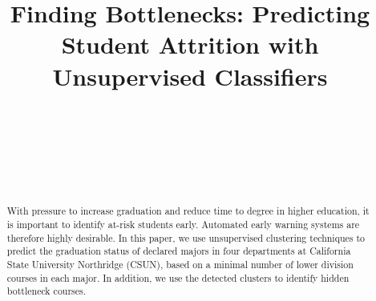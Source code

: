 \documentclass{sigchi}
\begin{document}
\title{Finding Bottlenecks: Predicting Student Attrition with Unsupervised Classifiers}

\author{%
  \\
 \\
  \\
  \\
  \\
}

\maketitle
\begin{abstract}
  
With pressure to increase graduation and reduce time to degree in higher education, it is important to identify at-risk students early. Automated early warning systems are therefore highly desirable. In this paper, we use unsupervised clustering techniques to predict the graduation status of declared majors in four departments at California State University Northridge (CSUN), based on a minimal number of lower division courses in each major. In addition, we use the detected clusters to identify hidden bottleneck courses. 
\end{abstract}
\end{document}
